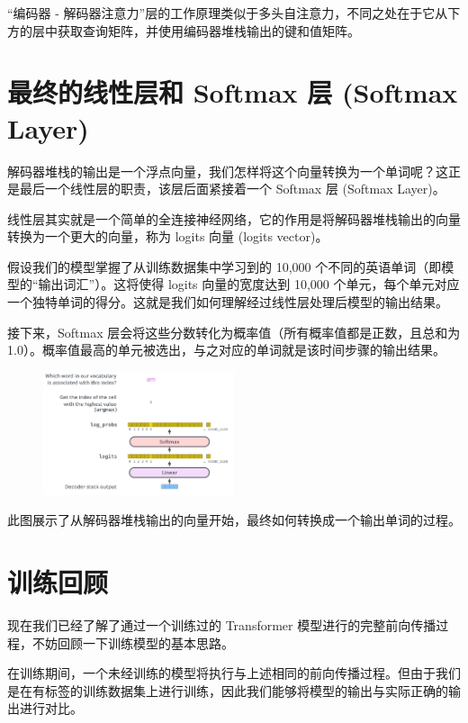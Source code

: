 \documentclass[cn,hazy,blue,10pt,normal]{elegantnote}
\begin{document}
“编码器 - 解码器注意力”层的工作原理类似于多头自注意力，不同之处在于它从下方的层中获取查询矩阵，并使用编码器堆栈输出的键和值矩阵。

\section{最终的线性层和 Softmax 层 (Softmax Layer)}

解码器堆栈的输出是一个浮点向量，我们怎样将这个向量转换为一个单词呢？这正是最后一个线性层的职责，该层后面紧接着一个 Softmax 层 (Softmax Layer)。

线性层其实就是一个简单的全连接神经网络，它的作用是将解码器堆栈输出的向量转换为一个更大的向量，称为 logits 向量 (logits vector)。

假设我们的模型掌握了从训练数据集中学习到的 10,000 个不同的英语单词（即模型的“输出词汇”）。这将使得 logits 向量的宽度达到 10,000 个单元，每个单元对应一个独特单词的得分。这就是我们如何理解经过线性层处理后模型的输出结果。

接下来，Softmax 层会将这些分数转化为概率值（所有概率值都是正数，且总和为 1.0）。概率值最高的单元被选出，与之对应的单词就是该时间步骤的输出结果。

\begin{figure}[ht]
	\centering
	\includegraphics[width=0.5\textwidth]{image/transformer_decoder_output_softmax.png}
\end{figure}

此图展示了从解码器堆栈输出的向量开始，最终如何转换成一个输出单词的过程。

\section{训练回顾}

现在我们已经了解了通过一个训练过的 Transformer 模型进行的完整前向传播过程，不妨回顾一下训练模型的基本思路。

在训练期间，一个未经训练的模型将执行与上述相同的前向传播过程。但由于我们是在有标签的训练数据集上进行训练，因此我们能够将模型的输出与实际正确的输出进行对比。
\end{document}
